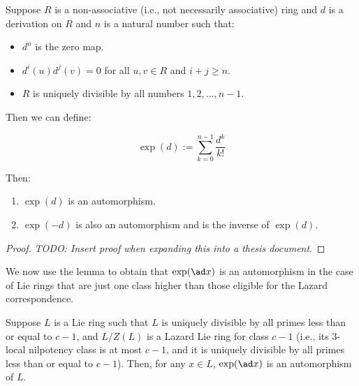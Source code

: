 \begin{lemma}
  Suppose $R$ is a non-associative (i.e., not necessarily associative)
  ring and $d$ is a derivation on $R$ and $n$ is a natural number such
  that:
  
  \begin{itemize}
  \item $d^n$ is the zero map.
  \item $d^i(u)d^j(v) = 0$ for all $u,v \in R$ and $i + j \ge n$.
  \item $R$ is uniquely divisible by all numbers $1,2,\dots,n-1$.
  \end{itemize}
  
  Then we can define:

  $$\exp(d) := \sum_{k=0}^{n-1} \frac{d^k}{k!}$$
  
  Then:

  \begin{enumerate}
  \item $\exp(d)$ is an automorphism.
  \item $\exp(-d)$ is also an automorphism and is the inverse of
  $\exp(d)$.
  \end{enumerate}
\end{lemma}

\begin{proof}
  {\em TODO: Insert proof when expanding this into a thesis document}.
\end{proof}

We now use the lemma to obtain that $\exp(\ad x)$ is an automorphism
in the case of Lie rings that are just one class higher than those
eligible for the Lazard correspondence.

\begin{lemma}
  Suppose $L$ is a Lie ring such that $L$ is uniquely divisible by all
  primes less than or equal to $c - 1$, and $L/Z(L)$ is a Lazard Lie
  ring for class $c - 1$ (i.e., its $3$-local nilpotency class is at
  most $c - 1$, and it is uniquely divisible by all primes less than
  or equal to $c - 1$). Then, for any $x \in L$, $\exp(\ad x)$ is an
  automorphism of $L$.
\end{lemma}

